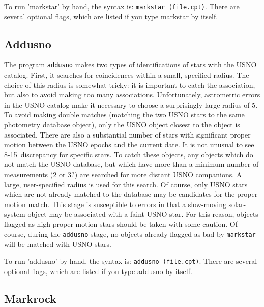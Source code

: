 \documentclass{article}
\begin{document}
To run 'markstar' by hand, the syntax is: {\tt markstar (file.cpt)}.
There are several optional flags, which are listed if you type
markstar by itself.

\subsection{Addusno}

The program {\tt addusno} makes two types of identifications of stars
with the USNO catalog.  First, it searches for coincidences within a
small, specified radius.  The choice of this radius is somewhat
tricky: it is important to catch the association, but also to avoid
making too many associations.  Unfortunately, astrometric errors in
the USNO catalog make it necessary to choose a surprisingly large
radius of 5\asec.  To avoid making double matches (matching the two
USNO stars to the same photometry database object), only the USNO
object closest to the object is associated.  There are also a
substantial number of stars with significant proper motion between the
USNO epochs and the current date.  It is not unusual to see 8-15\asec\ 
discrepancy for specific stars.  To catch these objects, any objects
which do not match the USNO database, but which have more than a
minimum number of measurements (2 or 3?) are searched for more distant
USNO companions.  A large, user-specified radius is used for this
search.  Of course, only USNO stars which are not already matched to
the database may be candidates for the proper motion match.  This
stage is susceptible to errors in that a slow-moving solar-system
object may be associated with a faint USNO star.  For this reason,
objects flagged as high proper motion stars should be taken with some
caution.  Of course, during the {\tt addusno} stage, no objects
already flagged as bad by {\tt markstar} will be matched with USNO
stars.  

To run 'addusno' by hand, the syntax is: {\tt addusno (file.cpt)}.
There are several optional flags, which are listed if you type
addusno by itself.

\subsection{Markrock}
\end{document}
